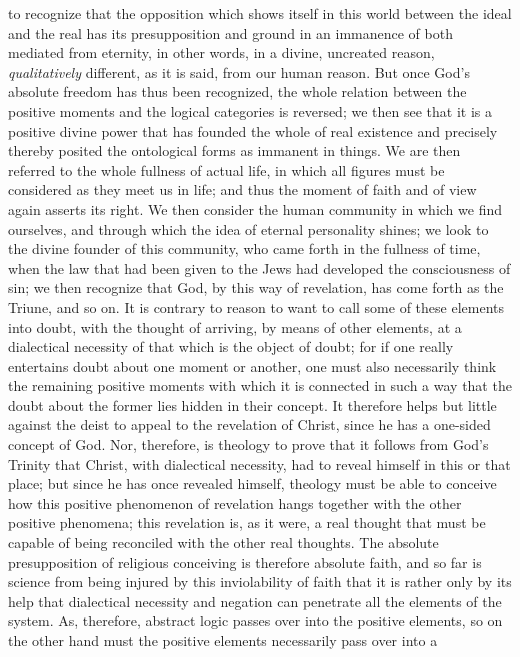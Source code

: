 \documentclass[12pt]{book}
\newcommand{\opage}[1]{\marginnote{\footnotesize\textit{[#1]}}}
\begin{document}
to recognize that the opposition which shows itself in this world between the
ideal and the real has its presupposition and ground in an immanence of both
mediated from eternity, in other words, in a divine, uncreated reason,
\emph{qualitatively} different, as it is said, from our human reason. But once
God's absolute freedom has thus been recognized, the whole relation between the
positive moments and the logical categories is reversed; we then see that it is
a positive divine power that has founded the whole of real existence and
precisely thereby posited the ontological forms as immanent in things. We are
then referred to the whole fullness of actual life, in which all figures must be
considered as they meet us in life; and thus the moment of faith and of view
again asserts its right. We then consider the human community in which we find
ourselves, and through which the idea of eternal personality shines; we look to
the divine founder of this community, who came forth in the fullness of time,
when the law that had been given to the Jews had developed the consciousness of
sin; we then recognize that God, by this way of revelation, has come forth as
the Triune, and so on. It is contrary to reason to want to call some of these
elements into doubt, with the thought of arriving, by means of other elements,
at a dialectical necessity of that
\opage{146} \setcounter{footnote}{0}%
which is the object of doubt; for if one really entertains doubt about one
moment or another, one must also necessarily think the remaining positive
moments with which it is connected in such a way that the doubt about the former
lies hidden in their concept. It therefore helps but little against the deist to
appeal to the revelation of Christ, since he has a one-sided concept of God. Nor,
therefore, is theology to prove that it follows from God's Trinity that Christ,
with dialectical necessity, had to reveal himself in this or that place; but
since he has once revealed himself, theology must be able to conceive how this
positive phenomenon of revelation hangs together with the other positive
phenomena; this revelation is, as it were, a real thought that must be capable of
being reconciled with the other real thoughts. The absolute presupposition of
religious conceiving is therefore absolute faith, and so far is science from
being injured by this inviolability of faith that it is rather only by its help
that dialectical necessity and negation can penetrate all the elements of the
system. As, therefore, abstract logic passes over into the positive elements, so
on the other hand must the positive elements necessarily pass over into a
\end{document}
